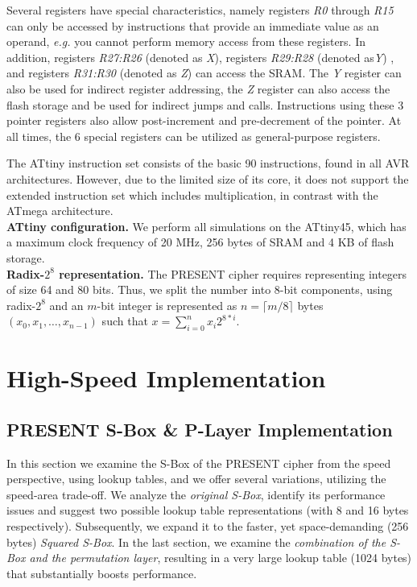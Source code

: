 \documentclass[11pt]{llncs2e} %
\begin{document}
Several registers have special characteristics, namely registers \textit{R0} through \textit{R15} can only be accessed by instructions that provide an immediate value as an operand, \emph{e.g.} you cannot perform memory access from these registers.
In addition, registers \textit{R27:R26} (denoted as \emph{X}), registers \textit{R29:R28} (denoted as\emph{Y}) , and registers \textit{R31:R30} (denoted as \emph{Z}) can access the SRAM.
The \emph{Y} register can also be used for indirect register addressing, the \emph{Z} register can also access the flash storage and be used for indirect jumps and calls.
Instructions using these 3 pointer registers also allow post-increment and pre-decrement of the pointer.
At all times, the 6 special registers can be utilized as general-purpose registers.

The ATtiny instruction set consists of the basic 90 instructions, found in all AVR architectures. However, due to the limited size of its core, it does not support the extended instruction set which includes multiplication, in contrast with the ATmega architecture.\\
\textbf{ATtiny configuration.} We perform all simulations on the ATtiny45, which has a maximum clock frequency of 20 MHz, 256 bytes of SRAM and 4 KB of flash storage.\\
\textbf{Radix-$2^8$ representation.} The PRESENT cipher requires representing integers of size 64 and 80 bits. Thus, we split the number into 8-bit components, using radix-$2^8$ and an $m$-bit integer is represented as $n=\lceil{m/8}\rceil$ bytes $(x_0,x_1,\dots,x_{n-1})$ such that $x=\sum_{i=0}^n{x_i 2^{8*i}}$.

\section{High-Speed Implementation}

\subsection{PRESENT S-Box \& P-Layer Implementation}\label{sbox}
In this section we examine the S-Box of the PRESENT cipher from the speed perspective, using lookup tables, and we offer several variations, utilizing the speed-area trade-off. We analyze the \emph{original S-Box}, identify its performance issues and suggest two possible lookup table representations (with 8 and 16 bytes respectively). Subsequently, we expand it to the faster, yet space-demanding (256 bytes) \emph{Squared S-Box}. In the last section, we examine the \emph{combination of the S-Box and the permutation layer}, resulting in a very large lookup table (1024 bytes) that substantially boosts performance.
\end{document}
